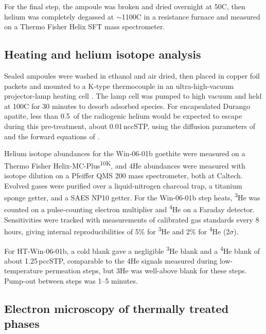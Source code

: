 For the final step, the ampoule was broken and dried overnight at 50\textdegree C, then helium was completely degassed at $\sim$1100\textdegree C in a resistance furnace and measured on a Thermo Fisher Helix SFT mass spectrometer. 

\subsection{Heating and helium isotope analysis}\label{sec:methods-analysis}

Sealed ampoules were washed in ethanol and air dried, then placed in copper foil packets and mounted to a K-type thermocouple in an ultra-high-vacuum projector-lamp heating cell \citep{farley1999}. The lamp cell was pumped to high vacuum and held at 100\textdegree C for 30 minutes to desorb adsorbed species. For encapsulated Durango apatite, less than 0.5\,\textperthousand{} of the radiogenic helium would be expected to escape during this pre-treatment, about 0.01\,nccSTP, using the diffusion parameters of \citet{farley2000} and the forward equations of \citet{fechtigkalbitzer1966}.

Helium isotope abundances for the Win-06-01b goethite were measured on a Thermo Fisher Helix-MC-Plus\textsuperscript{10K}, and 4He abundances were measured with isotope dilution on a Pfeiffer QMS 200 mass spectrometer, both at Caltech. Evolved gases were purified over a liquid-nitrogen charcoal trap, a titanium sponge getter, and a SAES NP10 getter. For the Win-06-01b step heats, \textsuperscript{3}He was counted on a pulse-counting electron multiplier and \textsuperscript{4}He on a Faraday detector. Sensitivities were tracked with measurements of calibrated gas standards every 8 hours, giving internal reproducibilities of 5\% for \textsuperscript{3}He and 2\% for \textsuperscript{4}He (2$\sigma$).

For HT-Win-06-01b, a cold blank gave a negligible \textsuperscript{3}He blank and a \textsuperscript{4}He blank of about 1.25\,pccSTP, comparable to the 4He signals measured during low-temperature permeation steps, but 3He was well-above blank for these steps. Pump-out between steps was 1--5 minutes.

\subsection{Electron microscopy of thermally treated phases}\label{sec:methods-sem}


